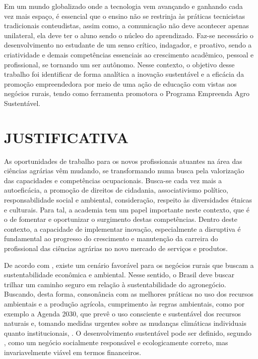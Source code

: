 Em um mundo globalizado onde a tecnologia vem avançando e ganhando cada vez mais espaço, é essencial que o ensino não se restrinja às práticas tecnicistas tradicionais conteudistas, assim como, a comunicação não deve acontecer apenas unilateral, ela deve ter o aluno sendo o núcleo do aprendizado. Faz-se necessário o desenvolvimento no estudante de um senso crítico, indagador, e proativo, sendo a criatividade e demais competências essenciais ao crescimento acadêmico, pessoal e profissional, se tornando um ser autônomo. Nesse contexto, o objetivo desse trabalho foi identificar de forma analítica a inovação sustentável e a eficácia da promoção empreendedora por meio de uma ação de educação com vistas aos negócios rurais, tendo como ferramenta promotora o Programa Empreenda Agro Sustentável.



\section{JUSTIFICATIVA}

As oportunidades de trabalho para os novos profissionais atuantes na área das ciências agrárias vêm mudando, se transformando numa busca pela valorização das capacidades e competências ocupacionais. Busca-se cada vez mais a autoeficácia, a promoção de direitos de cidadania, associativismo político, responsabilidade social e ambiental, consideração, respeito às diversidades étnicas e culturais. Para tal, a academia tem um papel importante neste contexto, que é o de fomentar e oportunizar o surgimento destas competências. Dentro deste contexto, a capacidade de implementar inovação, especialmente a disruptiva é fundamental ao progresso do crescimento e manutenção da carreira do profissional das ciências agrárias no novo mercado de serviços e produtos. 


De acordo com , existe um cenário favorável para os negócios rurais que buscam a sustentabilidade econômica e ambiental. Nesse sentido, o Brasil deve buscar trilhar um caminho seguro em relação à sustentabilidade do agronegócio. Buscando, desta forma, consonância com as melhores práticas no uso dos recursos ambientais e a produção agrícola, cumprimento às regras ambientais, como por exemplo a Agenda 2030, que prevê o uso consciente e sustentável dos recursos naturais e, tomando medidas urgentes sobre as mudanças climáticas individuais quanto institucionais, \cite{filho_documentos_2017}. O desenvolvimento sustentável pode ser definido, segundo \cite{lara_ideologia_2017}, como um negócio socialmente responsável e ecologicamente correto, mas invariavelmente viável em termos financeiros.


